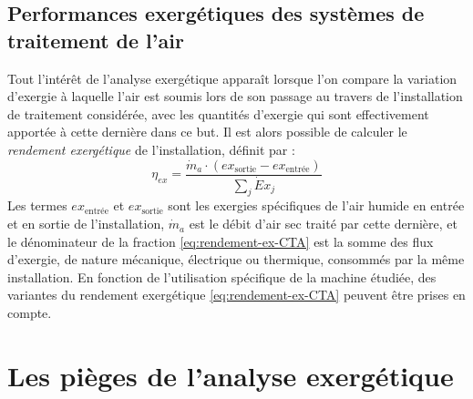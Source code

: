 \documentclass[a4paper,11pt]{scrartcl}
\begin{document}


\subsection{Performances exergétiques des systèmes de traitement de l'air} Tout l'intérêt de l'analyse exergétique apparaît lorsque l'on compare la variation d'exergie à laquelle l'air est soumis lors de son passage au travers de l'installation de traitement considérée, avec les quantités d'exergie qui sont effectivement apportée à cette dernière dans ce but. Il est alors possible de calculer le \emph{rendement exergétique} de l'installation, définit par : \begin{equation}
    \eta_{ex} = \frac{\dot{m}_a \cdot \left( ex_{\text{sortie}} - ex_{\text{entrée}} \right)}{\sum_j \dot{E}x_j} \label{eq:rendement-ex-CTA}
\end{equation} Les termes $ex_{\text{entrée}}$ et $ex_{\text{sortie}}$ sont les exergies spécifiques de l'air humide en entrée et en sortie de l'installation, $\dot{m}_a$ est le débit d'air sec traité par cette dernière, et le dénominateur de la fraction \eqref{eq:rendement-ex-CTA} est la somme des flux d'exergie, de nature mécanique, électrique ou thermique, consommés par la même installation. En fonction de l'utilisation spécifique de la machine étudiée, des variantes du rendement exergétique \eqref{eq:rendement-ex-CTA} peuvent être prises en compte.

\section{Les pièges de l'analyse exergétique}
\end{document}
